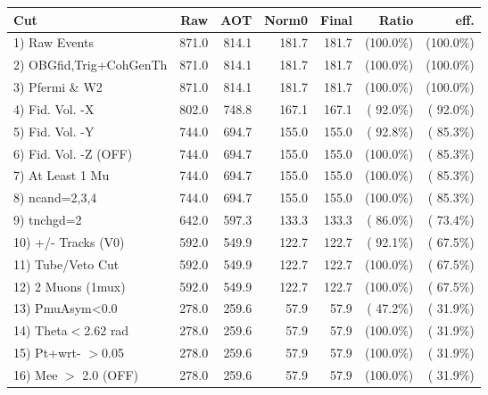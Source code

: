  \begin{table}[h!]\centering
 \begin{tabular}{||l||r|r|r|r|r|r||}
 \hline
 \hline
 Cut & Raw & AOT & Norm0 & Final & Ratio & eff.       \\
 \hline
  1) Raw Events           &        871.0 &        814.1 &        181.7 &        181.7 & (100.0\%) & (100.0\%) \\
  2) OBGfid,Trig+CohGenTh &        871.0 &        814.1 &        181.7 &        181.7 & (100.0\%) & (100.0\%) \\
  3) Pfermi \& W2         &        871.0 &        814.1 &        181.7 &        181.7 & (100.0\%) & (100.0\%) \\
  4) Fid. Vol. -X         &        802.0 &        748.8 &        167.1 &        167.1 & ( 92.0\%) & ( 92.0\%) \\
  5) Fid. Vol. -Y         &        744.0 &        694.7 &        155.0 &        155.0 & ( 92.8\%) & ( 85.3\%) \\
  6) Fid. Vol. -Z (OFF)   &        744.0 &        694.7 &        155.0 &        155.0 & (100.0\%) & ( 85.3\%) \\
  7) At Least 1 Mu        &        744.0 &        694.7 &        155.0 &        155.0 & (100.0\%) & ( 85.3\%) \\
  8) ncand=2,3,4          &        744.0 &        694.7 &        155.0 &        155.0 & (100.0\%) & ( 85.3\%) \\
  9) tnchgd=2             &        642.0 &        597.3 &        133.3 &        133.3 & ( 86.0\%) & ( 73.4\%) \\
 10) +/- Tracks (V0)      &        592.0 &        549.9 &        122.7 &        122.7 & ( 92.1\%) & ( 67.5\%) \\
 11) Tube/Veto Cut        &        592.0 &        549.9 &        122.7 &        122.7 & (100.0\%) & ( 67.5\%) \\
 12) 2 Muons (1mux)       &        592.0 &        549.9 &        122.7 &        122.7 & (100.0\%) & ( 67.5\%) \\
 13) PmuAsym<0.0          &        278.0 &        259.6 &         57.9 &         57.9 & ( 47.2\%) & ( 31.9\%) \\
 14) Theta$<$2.62 rad     &        278.0 &        259.6 &         57.9 &         57.9 & (100.0\%) & ( 31.9\%) \\
 15) Pt+wrt- $>$0.05      &        278.0 &        259.6 &         57.9 &         57.9 & (100.0\%) & ( 31.9\%) \\
 16) Mee $>$ 2.0  (OFF)   &        278.0 &        259.6 &         57.9 &         57.9 & (100.0\%) & ( 31.9\%) \\

\end{tabular}
\end{table}
